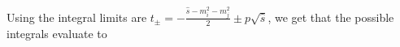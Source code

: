 \documentclass[../main.tex]{subfiles}
\begin{document}
Using the integral limits are \(t_\pm = -\frac{\hat{s} - m_i^2 - m_j^2}{2} \pm p\sqrt{\hat{s}}\), we get that the possible integrals evaluate to
\end{document}
